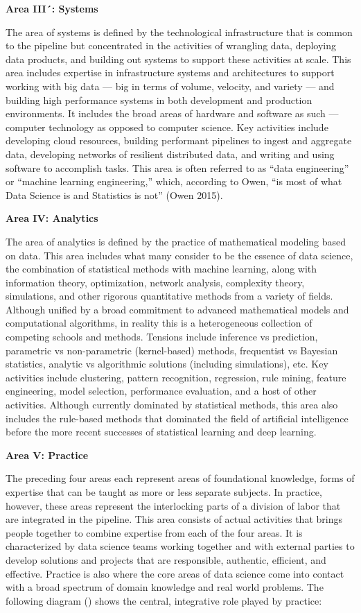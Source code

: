 \documentclass[
  letterpaper,
  DIV=11,
  numbers=noendperiod]{scrreprt}
\begin{document}
\textbf{Area III´: Systems}

The area of systems is defined by the technological infrastructure that
is common to the pipeline but concentrated in the activities of
wrangling data, deploying data products, and building out systems to
support these activities at scale. This area includes expertise in
infrastructure systems and architectures to support working with big
data --- big in terms of volume, velocity, and variety --- and building
high performance systems in both development and production
environments. It includes the broad areas of hardware and software as
such --- computer technology as opposed to computer science. Key
activities include developing cloud resources, building performant
pipelines to ingest and aggregate data, developing networks of resilient
distributed data, and writing and using software to accomplish tasks.
This area is often referred to as ``data engineering'' or ``machine
learning engineering,'' which, according to Owen, ``is most of what Data
Science is and Statistics is not'' (Owen 2015).

\textbf{Area IV: Analytics}

The area of analytics is defined by the practice of mathematical
modeling based on data. This area includes what many consider to be the
essence of data science, the combination of statistical methods with
machine learning, along with information theory, optimization, network
analysis, complexity theory, simulations, and other rigorous
quantitative methods from a variety of fields. Although unified by a
broad commitment to advanced mathematical models and computational
algorithms, in reality this is a heterogeneous collection of competing
schools and methods. Tensions include inference vs prediction,
parametric vs non-parametric (kernel-based) methods, frequentist vs
Bayesian statistics, analytic vs algorithmic solutions (including
simulations), etc. Key activities include clustering, pattern
recognition, regression, rule mining, feature engineering, model
selection, performance evaluation, and a host of other activities.
Although currently dominated by statistical methods, this area also
includes the rule-based methods that dominated the field of artificial
intelligence before the more recent successes of statistical learning
and deep learning.

\textbf{Area V: Practice}

The preceding four areas each represent areas of foundational knowledge,
forms of expertise that can be taught as more or less separate subjects.
In practice, however, these areas represent the interlocking parts of a
division of labor that are integrated in the pipeline. This area
consists of actual activities that brings people together to combine
expertise from each of the four areas. It is characterized by data
science teams working together and with external parties to develop
solutions and projects that are responsible, authentic, efficient, and
effective. Practice is also where the core areas of data science come
into contact with a broad spectrum of domain knowledge and real world
problems. The following diagram () shows the central, integrative role
played by practice:
\end{document}
